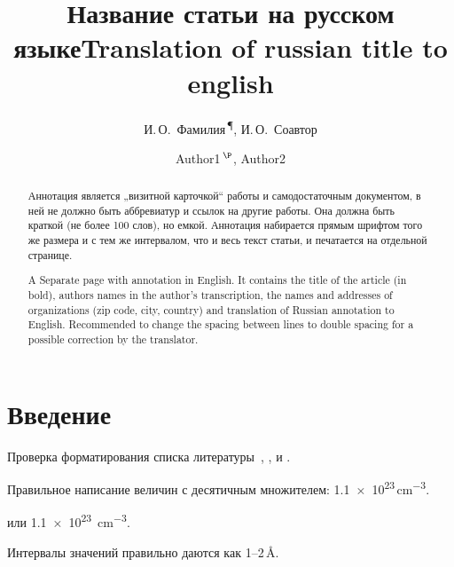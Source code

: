 \documentclass[14pt]{extarticle}
\begin{document}
\title{Название статьи на русском языке}
\author{И.\,О.~Фамилия\textsuperscript{\,\P}, И.\,О.~Соавтор}
\address{Физико-технический институт им. А. Ф. Иоффе Российской академии наук, 
\\ 194021 Санкт-Петербург, Россия.}
\def\topic{не менее двух}	%
\maketitle

\begin{abstract}
	Аннотация является „визитной карточкой“ работы и самодостаточным документом,
	в ней не должно быть аббревиатур и ссылок на другие работы. Она должна быть краткой
	(не более 100 слов), но емкой. Аннотация набирается прямым шрифтом того же размера
	и с тем же интервалом, что и весь текст статьи, и печатается на отдельной странице.
\end{abstract}


\begin{otherlanguage}{english}
	\title{Translation of russian title to english}
	\author{Author1$^{\,\P}$, Author2}
	\address{Ioffe Physicotechnical Institute, Russian Academy of Sciences, \\
		194021 St. Petersburg, Russia.}
	\maketitle
	
	\begin{abstract}
		A Separate page with annotation in English. It contains the title of the article (in bold), authors names in the author's transcription, the names and addresses of organizations (zip code, city, country) and translation of Russian annotation to English.  Recommended to change the spacing between lines to double spacing for a possible correction by the translator.
	\end{abstract}
\end{otherlanguage}

\section{Введение}
Проверка форматирования списка литературы~\cite{ref1,ref2,ref3},
\cite{ref4},
\cite{ref5,ref5eng,ref6} и 
\cite{ref7,ref8,ref9}.

Правильное написание величин с десятичным множителем: 
\num{1,1e23}\,\si{\cm^{-3}}. \par
или \SI{1,1e23}{\cm^{-3}}. \par
Интервалы значений правильно даются как \numrange{1}{2}\,\si{\angstrom}. 
\par
\end{document}
